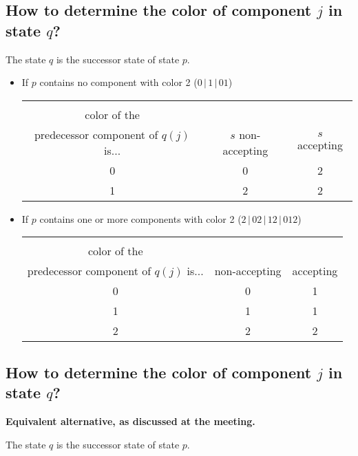 \documentclass[a4paper]{article}
\begin{document}
\subsection*{How to determine the color of component $j$ in state $q$?}

The state $q$ is the successor state of state $p$.

\begin{itemize} \itemsep2em
\item If $p$ contains no component with color 2 ($0\,|\,1\,|\,01$)

\begin{tabular}{|c|c|c|}
\hline
\backslashbox{The\\color of the\\predecessor component of $q(j)$ is...}{Component $q(j)$ is...} & $s$ non-accepting & $s$ accepting \\
\hline
  0 & 0 & 2 \\
\hline
1 & 2 & 2 \\
\hline
\end{tabular}

\item If $p$ contains one or more components with color 2 ($2\,|\,02\,|\,12\,|\,012$)

\begin{tabular}{|c|c|c|}
\hline
\backslashbox{The\\color of the\\predecessor component of $q(j)$ is...}{Component $q(j)$ is...} & non-accepting & accepting \\
\hline
0 & 0 & 1 \\
\hline
1 & 1 & 1 \\
\hline
2 & 2 & 2 \\
\hline
\end{tabular}

\end{itemize}



\pagebreak



\subsection*{How to determine the color of component $j$ in state $q$?}

\textbf{Equivalent alternative, as discussed at the meeting.}

The state $q$ is the successor state of state $p$.
\end{document}
